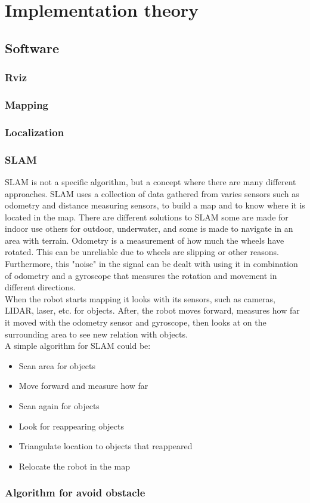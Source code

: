 \chapter{Implementation theory}

\section{Software}

\subsection{Rviz} \label{ch:Frontier Exploration}

\subsection{Mapping}

\subsection{Localization}

\subsection{SLAM}

SLAM is not a specific algorithm, but a concept where there are many different approaches. SLAM uses a collection of data gathered from varies sensors such as odometry and distance measuring sensors, to build a map and to know where it is located in the map.
There are different solutions to SLAM some are made for indoor use others for outdoor, underwater, and some is made to navigate in an area with terrain. Odometry is a measurement of how much the wheels have rotated. This can be unreliable due to wheels are slipping or other reasons. Furthermore, this "noise" in the signal can be dealt with using it in combination of odometry and a gyroscope that measures the rotation and movement in different directions.\\
When the robot starts mapping it looks with its sensors, such as cameras, LIDAR, laser, etc. for objects. After, the robot moves forward, measures how far it moved with the odometry sensor and gyroscope, then looks at on the surrounding area to see new relation with objects\cite{SLAMdummies}\cite{DifferentSLAM}\cite{GyrosOdometry}.\\
A simple algorithm for SLAM could be:
\begin{itemize}
    \item Scan area for objects
    \item Move forward and measure how far
    \item Scan again for objects
    \item Look for reappearing objects
    \item Triangulate location to objects that reappeared
    \item Relocate the robot in the map 
\end{itemize}

\subsection{Algorithm for avoid obstacle}


